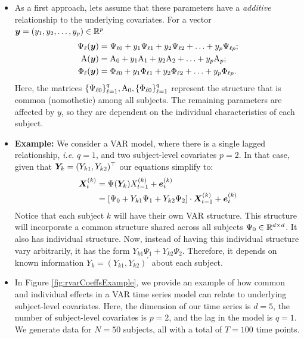 \begin{itemize}
	\item As a first approach, lets assume that these parameters have a \textit{additive} relationship to the underlying covariates. For a vector $\bm{y}=(y_1,y_2,\ldots ,y_p)\in\mathbb{R}^p$
	\begin{align*}
		\Psi_\ell(\bm{y}) &= \Psi_{\ell 0} + y_1 \Psi_{\ell 1} + y_2 \Psi_{\ell 2} + \ldots + y_p \Psi_{\ell p} ;\\
		\mathrm{A}(\bm{y}) &= \mathrm{A}_0 + y_1 \mathrm{A}_1 + y_2 \mathrm{A}_2 + \ldots + y_p \mathrm{A}_p ;\\
		\Phi_\ell(\bm{y}) &= \Phi_{\ell0} + y_1 \Phi_{\ell1} + y_2 \Phi_{\ell2} + \ldots + y_p \Phi_{\ell p}. \\
	\end{align*}
	Here, the matrices $\{\Psi_{\ell 0}\}_{\ell=1}^q, \mathrm{A}_0, \{\Phi_{\ell 0}\}_{\ell = 1}^q$ represent the structure that is common (nomothetic) among all subjects. The remaining parameters are affected by $y$, so they are dependent on the individual characteristics of each subject.

	\item \textbf{Example:} We consider a VAR model, where there is a single lagged relationship, \textit{i.e.} $q = 1$, and two subject-level covariates $p = 2$. In that case, given that $\bm{Y}_k = (Y_{k1},Y_{k2})^\top$ our equations simplify to:
	\begin{align*}
		\bm{X}^{(k)}_t &= \Psi(\bm{Y}_k) X_{t-1}^{(k)} + \bm{e}^{(k)}_{t}\\
		&= [\Psi_{0} + Y_{k1} \Psi_{1} + Y_{k2} \Psi_{2}] \cdot \bm{X}_{t-1}^{(k)} + \bm{e}^{(k)}_{t}
	\end{align*}
	Notice that each subject $k$ will have their own VAR structure. This structure will incorporate a common structure shared across all subjects $\Psi_0\in\mathbb{R}^{d\times d}$. It also has individual structure. Now, instead of having this individual structure vary arbitrarily, it has the form $Y_{k1} \Psi_{1} + Y_{k2} \Psi_{2}$. Therefore, it depends on known information $Y_k = (Y_{k1}, Y_{k2})^{'}$ about each subject.
	
	\item In Figure \ref{fig:rvarCoeffsExample}, we provide an example of how common and individual effects in a VAR time series model can relate to underlying subject-level covariates.	Here, the dimension of our time series is $ d = 5 $, the number of subject-level covariates is $ p = 2 $, and the lag in the model is $ q = 1 $. We generate data for $N = 50$ subjects, all with a total of $T = 100$ time points.



\end{itemize}
